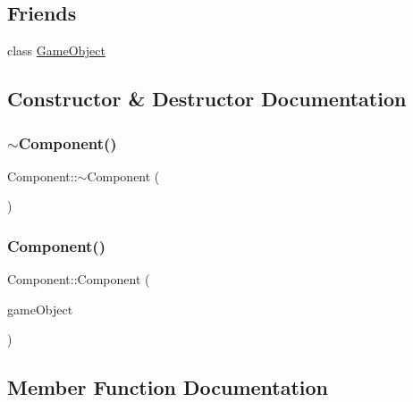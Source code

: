 \subsection*{Friends}
\begin{DoxyCompactItemize}
\item 
class \hyperlink{class_mason_1_1_component_a00df87c957d8f7ee0fc51f07a0542f4a}{Game\+Object}
\end{DoxyCompactItemize}


\subsection{Constructor \& Destructor Documentation}
\hypertarget{class_mason_1_1_component_ab8378fa275af98e568a7e91d33d867af}{}\label{class_mason_1_1_component_ab8378fa275af98e568a7e91d33d867af} 
\subsubsection{\texorpdfstring{$\sim$\+Component()}{~Component()}}
{\footnotesize\ttfamily Component\+::$\sim$\+Component (\begin{DoxyParamCaption}{ }\end{DoxyParamCaption})\hspace{0.3cm}{\ttfamily [virtual]}}

\hypertarget{class_mason_1_1_component_a19f394f7e3e940e7fc01d18d6a762d46}{}\label{class_mason_1_1_component_a19f394f7e3e940e7fc01d18d6a762d46} 
\subsubsection{\texorpdfstring{Component()}{Component()}}
{\footnotesize\ttfamily Component\+::\+Component (\begin{DoxyParamCaption}\item[{std\+::shared\+\_\+ptr$<$ \hyperlink{class_mason_1_1_game_object}{Game\+Object} $>$}]{game\+Object }\end{DoxyParamCaption})\hspace{0.3cm}{\ttfamily [protected]}}



\subsection{Member Function Documentation}
\hypertarget{class_mason_1_1_component_a6c96ba73e4added598bfa975e000a3ea}{}\label{class_mason_1_1_component_a6c96ba73e4added598bfa975e000a3ea} 
